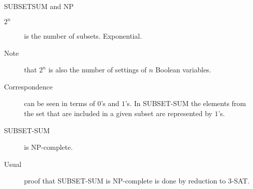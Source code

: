 \begin{frame}{SUBSETSUM and NP}
  \begin{description}
    \item[$2^n$] is the number of subsets. Exponential.
    \item[Note] that $2^n$ is also the number of settings of $n$ Boolean variables.
    \item[Correspondence] can be seen in terms of $0$'s and $1$'s. In SUBSET-SUM the elements from the set that are included in a given subset are represented by $1$'s.
    \item[SUBSET-SUM] is NP-complete.
    \item[Usual] proof that SUBSET-SUM is NP-complete is done by reduction to 3-SAT.
  \end{description}
\end{frame}